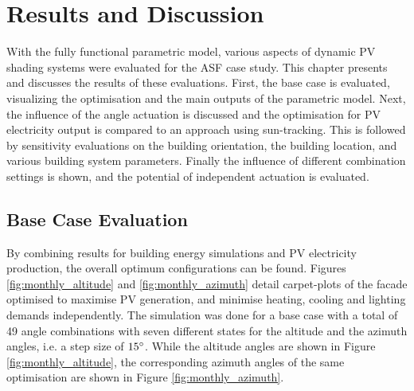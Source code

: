 \chapter{Results and Discussion}
\label{ch:results}

With the fully functional parametric model, various aspects of dynamic PV shading systems were evaluated for the ASF case study. This chapter presents and discusses the results of these evaluations. First, the base case is evaluated, visualizing the optimisation and the main outputs of the parametric model. Next, the influence of the angle actuation is discussed and the optimisation for PV electricity output is compared to an approach using sun-tracking. This is followed by sensitivity evaluations on the building orientation, the building location, and various building system parameters. Finally the influence of different combination settings is shown, and the potential of independent actuation is evaluated. 


\section{Base Case Evaluation}
\label{s:baseCase}
	By combining results for building energy simulations and PV electricity production, the overall optimum configurations can be found. Figures \ref{fig:monthly_altitude} and \ref{fig:monthly_azimuth} detail carpet-plots of the facade optimised to maximise PV generation, and minimise heating, cooling and lighting demands independently. The simulation was done for a base case with a total of 49 angle combinations with seven different states for the altitude and the azimuth angles, i.e. a step size of $15\degree$. While the altitude angles are shown in Figure \ref{fig:monthly_altitude}, the corresponding azimuth angles of the same optimisation are shown in Figure \ref{fig:monthly_azimuth}.

